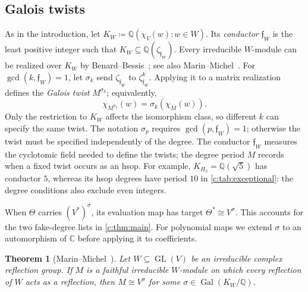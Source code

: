 \documentclass[10pt,a4paper]{amsart}
\newcommand{\defeq}{\coloneqq}
\newcommand{\defn}[1]{\emph{\color{darkblue}#1}}
\newtheorem{theorem}{Theorem}[section]
\theoremstyle{definition}
\newcommand{\C}{\mathbb C}\newcommand{\Q}{\mathbb Q}
\begin{document}
\subsection{Galois twists}\label{b:sec:galois}


As in the introduction, let $K_W\defeq\Q(\chi_V(w):w\in W)$.
Its \defn{conductor} $\mathfrak f_W$ is the least positive integer
such that $K_W\subseteq\Q(\zeta_{\mathfrak f_W})$. Every irreducible
$W$-module can be realized over $K_W$ by Benard--Bessis~\cite{Benard,BessisField};
see also Marin--Michel~\cite[Introduction]{MarinMichel}.
For $\gcd(k,\mathfrak f_W)=1$, let $\sigma_k$ send
$\zeta_{\mathfrak f_W}$ to $\zeta_{\mathfrak f_W}^k$.
Applying it to a matrix realization defines the \defn{Galois twist}
$M^{\sigma_k}$; equivalently,
\[
 \chi_{M^{\sigma_k}}(w)=\sigma_k(\chi_M(w)).
\]
Only the restriction to $K_W$ affects the isomorphism class, so
different $k$ can specify the same twist. The notation $\sigma_p$
requires $\gcd(p,\mathfrak f_W)=1$; otherwise the twist must be
specified independently of the degree. The conductor $\mathfrak f_W$
measures the cyclotomic field needed to define the twists; the degree
period $M$ records when a fixed twist occurs as an hsop. For example,
$K_{H_3}=\Q(\sqrt5)$ has conductor $5$, whereas its hsop degrees have
period $10$ in \cref{c:tab:exceptional}: the degree conditions also
exclude even integers.

When $\Theta$ carries $(V^*)^\sigma$, its evaluation map has
target $\Theta^*\cong V^\sigma$. This accounts for the two fake-degree lists in
\cref{c:thm:main}. For polynomial maps we extend $\sigma$ to an
automorphism of $\C$ before applying it to coefficients.

\begin{theorem}[{Marin--Michel~\cite[Theorem~1.2]{MarinMichel}}]
\label{b:thm:MarinMichel}
Let $W\subseteq\operatorname{GL}(V)$ be an irreducible complex
reflection group. If $M$ is a faithful irreducible $W$-module on which
every reflection of $W$ acts as a reflection, then $M\cong V^\sigma$
for some $\sigma\in\operatorname{Gal}(K_W/\Q)$.
\end{theorem}
\end{document}
